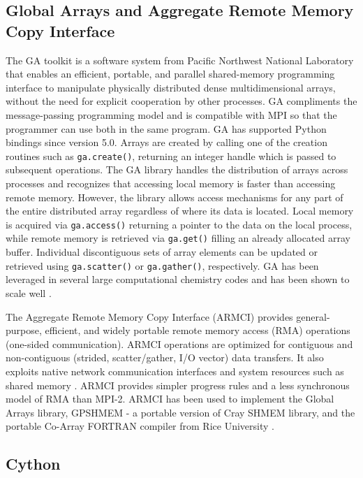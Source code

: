 \documentclass{sigplanconf}
\begin{document}
\subsection{Global Arrays and Aggregate Remote Memory Copy Interface}

The GA toolkit \cite{Nie06,Nie10,Pnl11} is a software system from Pacific
Northwest National Laboratory that enables an efficient, portable, and
parallel shared-memory programming interface to manipulate physically
distributed dense multidimensional arrays, without the need for explicit
cooperation by other processes. GA compliments the message-passing programming
model and is compatible with MPI so that the programmer can use both in the
same program. GA has supported Python bindings since version 5.0. Arrays are
created by calling one of the creation routines such as \verb=ga.create()=,
returning an integer handle which is passed to subsequent operations. The GA
library handles the distribution of arrays across processes and recognizes
that accessing local memory is faster than accessing remote memory. However,
the library allows access mechanisms for any part of the entire distributed
array regardless of where its data is located. Local memory is acquired via
\verb=ga.access()= returning a pointer to the data on the local process, while
remote memory is retrieved via \verb=ga.get()= filling an already allocated
array buffer. Individual discontiguous sets of array elements can be updated
or retrieved using \verb=ga.scatter()= or \verb=ga.gather()=, respectively.
GA has been leveraged in several large computational chemistry codes and has
been shown to scale well \cite{Apr09}.

The Aggregate Remote Memory Copy Interface (ARMCI) provides general-purpose,
efficient, and widely portable remote memory access (RMA) operations
(one-sided communication). ARMCI operations are optimized for contiguous and
non-contiguous (strided, scatter/gather, I/O vector) data transfers. It also
exploits native network communication interfaces and system resources such as
shared memory \cite{Nie00}.  ARMCI provides simpler progress rules and a less
synchronous model of RMA than MPI-2. ARMCI has been used to implement the
Global Arrays library, GPSHMEM - a portable version of Cray SHMEM library, and
the portable Co-Array FORTRAN compiler from Rice University \cite{Dot04}.

\subsection{Cython}
\end{document}
